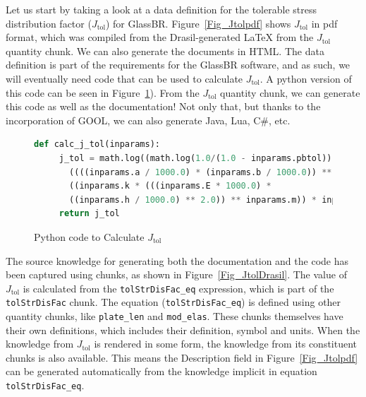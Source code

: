 \documentclass[sigconf]{acmart}
\newcommand{\authornt}[3]{\textcolor{#1}{[#3 ---#2]}}
\newcommand{\authornt}[3]{}
\newcommand{\ds}[1]{\authornt{red}{DS}{#1}} %
\newcommand{\spr}[1]{\authornt{green}{SP}{#1}} %
\newcommand{\jtol}{$J_{\mbox{tol}}$}
\newcommand{\inlHask}[1]{\lstinline[language=Haskell, columns=fullflexible,
  basicstyle=\ttfamily, showstringspaces=false, breaklines=true]{#1}}
\begin{document}
Let us start by taking a look at a data definition for the tolerable stress
distribution factor (\jtol{}) for GlassBR. Figure~\ref{Fig_Jtolpdf} shows
\jtol{} in pdf format, which was compiled from the Drasil-generated LaTeX from
the \jtol{} quantity chunk. We can also generate the documents in HTML. The data
definition is part of the requirements for the GlassBR software, and as such, we
will eventually need code that can be used to calculate \jtol{}.  A python
version of this code can be seen in Figure~\ref{Fig_JtolPython}). From the
\jtol{} quantity chunk, we can generate this code as well as the documentation!
Not only that, but thanks to the incorporation of GOOL, we can also generate
Java, Lua, C\#, etc.

 \begin{figure}
 \begin{lstlisting}[language=python, frame=single, showstringspaces=false]
 def calc_j_tol(inparams):
     j_tol = math.log((math.log(1.0/(1.0 - inparams.pbtol))) * 
       ((((inparams.a / 1000.0) * (inparams.b / 1000.0)) ** (inparams.m - 1.0)) / 
       ((inparams.k * (((inparams.E * 1000.0) * 
       ((inparams.h / 1000.0) ** 2.0)) ** inparams.m)) * inparams.ldf))) 
     return j_tol
 \end{lstlisting}
 \caption{Python code to Calculate \jtol{}}
 \label{Fig_JtolPython}
 \end{figure}



The source knowledge for generating both the documentation and the code has been
captured using chunks, as shown in Figure~\ref{Fig_JtolDrasil}. The value of
\jtol{} is calculated from the {\inlHask{tolStrDisFac_eq}} expression, which is
part of the {\inlHask{tolStrDisFac}} chunk.  The equation ({\inlHask{tolStrDisFac_eq}}) is
defined using other quantity chunks, like {\inlHask{plate_len}} and
{\inlHask{mod_elas}}.  These chunks themselves have their own definitions, which
includes their definition, symbol and units.  When the knowledge from \jtol{} is
rendered in some form, the knowledge from its constituent chunks is also
available.  This means the Description field in Figure~\ref{Fig_Jtolpdf} can be
generated automatically from the knowledge implicit in equation
{\inlHask{tolStrDisFac_eq}}.  
\end{document}
